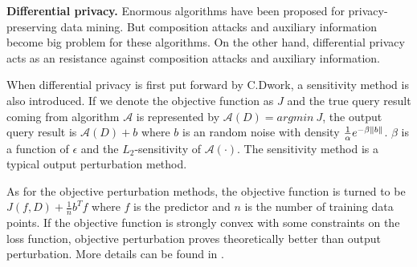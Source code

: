 
\textbf{Differential privacy.} Enormous algorithms have been proposed for privacy-preserving data mining\cite{Agrawal:2000:PDM:335191.335438,Evfimievski:2003:LPB:773153.773174,Sweeney:2002:KAM:774544.774552,Machanavajjhala:2007:LDP:1217299.1217302}. But composition attacks and auxiliary information become big problem for these algorithms. On the other hand, differential privacy acts as an resistance against composition attacks and auxiliary information.

When differential privacy is first put forward by C.Dwork\cite{Dwork:2006:CNS:2180286.2180305}, a sensitivity method is also introduced. If we denote the objective function as $J$ and the true query result coming from algorithm $\mathcal{A}$ is represented by $\mathcal{A}(D) = argmin\ J $, the output query result is $\mathcal{A}(D)+b$ where $b$ is an random noise with density $\frac{1}{\alpha} e^{-\beta \lVert b\rVert}$. $\beta$ is a function of $\epsilon$ and the $L_2$-sensitivity of $\mathcal{A}(\cdot)$. The sensitivity method is a typical output perturbation method.

As for the objective perturbation methods, the objective function is turned to be $J(f,D)+\frac{1}{n}b^T f$ where $f$ is the predictor and $n$ is the number of training data points. If the objective function is strongly convex with some constraints on the loss function, objective perturbation proves theoretically better than output perturbation. More details can be found in \cite{Chaudhuri:2011:DPE:1953048.2021036}.

